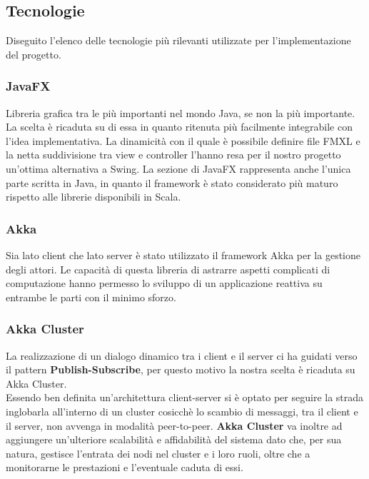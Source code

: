             


        \subsection{Tecnologie}\label{subsec:technologies}
        Diseguito l'elenco delle tecnologie più rilevanti utilizzate per l'implementazione del progetto.
	  \subsubsection{JavaFX}\label{subsub:tecnologie:javafx}
	    Libreria grafica tra le più importanti nel mondo Java, se non la più importante. 
	    \\
	    La scelta è ricaduta su di essa in quanto ritenuta più facilmente integrabile con l'idea implementativa. 
	    La dinamicità con il quale è possibile definire file FMXL e la netta suddivisione tra view e controller l'hanno resa per il nostro progetto un'ottima alternativa a Swing.
	    La sezione di JavaFX rappresenta anche l'unica parte scritta in Java, in quanto il framework è stato considerato più maturo rispetto alle librerie disponibili in Scala.
	    
	 \subsubsection{Akka}\label{subsub:tecnologie:akka}
	   Sia lato client che lato server è stato utilizzato il framework Akka per la gestione degli attori. 
	   Le capacità di questa libreria di astrarre aspetti complicati di computazione hanno permesso lo sviluppo di un applicazione reattiva su entrambe le parti con il minimo sforzo. 
	   
	 
	 \subsubsection{Akka Cluster}\label{subsub:tecnologie:akkacluster}
	   La realizzazione di un dialogo dinamico tra i client e il server ci ha guidati verso il pattern \textbf{Publish-Subscribe}, per questo motivo la nostra scelta è ricaduta su Akka Cluster. 
	   \\
	   Essendo ben definita un'architettura client-server si è optato per seguire la strada inglobarla all'interno di un cluster cosicchè lo scambio di messaggi, tra il client e il server, non avvenga in modalità peer-to-peer.
	   \textbf{Akka Cluster} va inoltre ad aggiungere un'ulteriore scalabilità e affidabilità del sistema dato che, per sua natura, gestisce l'entrata dei nodi nel cluster e i loro ruoli, oltre che a monitorarne le prestazioni e l'eventuale caduta di essi. 
